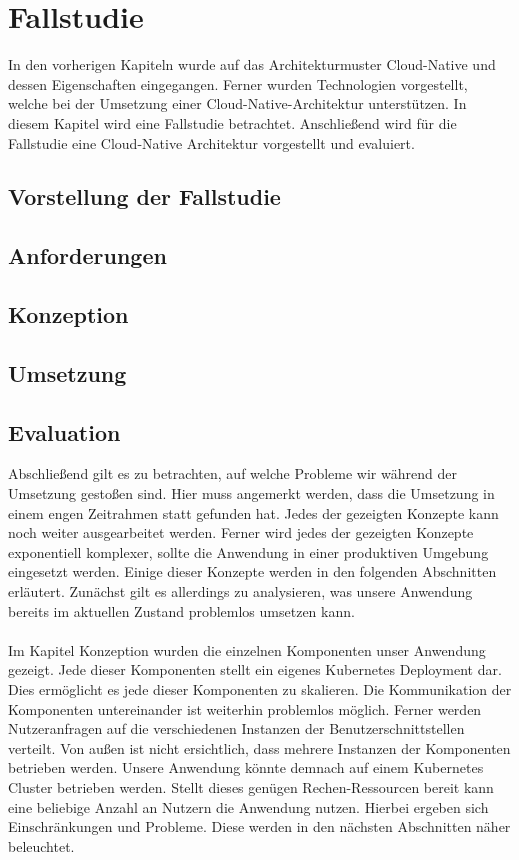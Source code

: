 \chapter{Fallstudie}
\label{ch:fallstudie}
In den vorherigen Kapiteln wurde auf das Architekturmuster Cloud-Native und dessen Eigenschaften eingegangen. Ferner wurden Technologien vorgestellt, welche bei der Umsetzung einer Cloud-Native-Architektur unterstützen. In diesem Kapitel wird eine Fallstudie betrachtet. Anschließend wird für die Fallstudie eine Cloud-Native Architektur vorgestellt und evaluiert.

\section{Vorstellung der Fallstudie}
\section{Anforderungen}
\section{Konzeption}
\section{Umsetzung}
\section{Evaluation}
Abschließend gilt es zu betrachten, auf welche Probleme wir während der Umsetzung gestoßen sind. Hier muss angemerkt werden, dass die Umsetzung in einem engen Zeitrahmen statt gefunden hat. Jedes der gezeigten Konzepte kann noch weiter ausgearbeitet werden. Ferner wird jedes der gezeigten Konzepte exponentiell komplexer, sollte die Anwendung in einer produktiven Umgebung eingesetzt werden. Einige dieser Konzepte werden in den folgenden Abschnitten erläutert. Zunächst gilt es allerdings zu analysieren, was unsere Anwendung bereits im aktuellen Zustand problemlos umsetzen kann.\\
\\
Im Kapitel Konzeption wurden die einzelnen Komponenten unser Anwendung gezeigt. Jede dieser Komponenten stellt ein eigenes Kubernetes Deployment dar. Dies ermöglicht es jede dieser Komponenten zu skalieren. Die Kommunikation der Komponenten untereinander ist weiterhin problemlos möglich. Ferner werden Nutzeranfragen auf die verschiedenen Instanzen der Benutzerschnittstellen verteilt. Von außen ist nicht ersichtlich, dass mehrere Instanzen der Komponenten betrieben werden. Unsere Anwendung könnte demnach auf einem Kubernetes Cluster betrieben werden. Stellt dieses genügen Rechen-Ressourcen bereit kann eine beliebige Anzahl an Nutzern die Anwendung nutzen. Hierbei ergeben sich Einschränkungen und Probleme. Diese werden in den nächsten Abschnitten näher beleuchtet.
